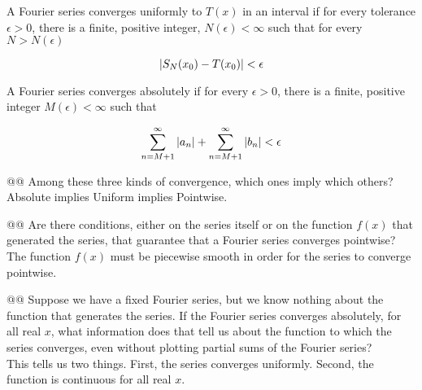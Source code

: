 \documentclass[10pt]{article}
\begin{document}
\begin{easylist}[enumerate]
    \begin{definition}
        A Fourier series converges uniformly to $T(x)$ in an interval if for every tolerance $\epsilon > 0$, there is a
        finite, positive integer, $N(\epsilon) < \infty$ such that for every $N > N(\epsilon)$

        \[
            \left\lvert S_N(x_0) - T(x_0) \right\rvert < \epsilon
        \]
    \end{definition}

    \begin{definition}
        A Fourier series converges absolutely if for every $\epsilon > 0$, there is a finite, positive integer
        $M(\epsilon) < \infty$ such that

        \[
            \sum_{n=M+1}^\infty \left\lvert a_n \right\rvert + \sum_{n=M+1}^\infty \left\lvert b_n \right\rvert < \epsilon
        \]
    \end{definition}

    @@ Among these three kinds of convergence, which ones imply which others?\\

    Absolute implies Uniform implies Pointwise.

    @@ Are there conditions, either on the series itself or on the function $f(x)$ that generated the series, that
    guarantee that a Fourier series converges pointwise?\\

    The function $f(x)$ must be piecewise smooth in order for the series to converge pointwise.

    @@ Suppose we have a fixed Fourier series, but we know nothing about the function that generates the series. If the
    Fourier series converges absolutely, for all real $x$, what information does that tell us about the function to
    which the series converges, even without plotting partial sums of the Fourier series?\\

    This tells us two things. First, the series converges uniformly. Second, the function is continuous for all real $x$.
\end{easylist}
\end{document}
